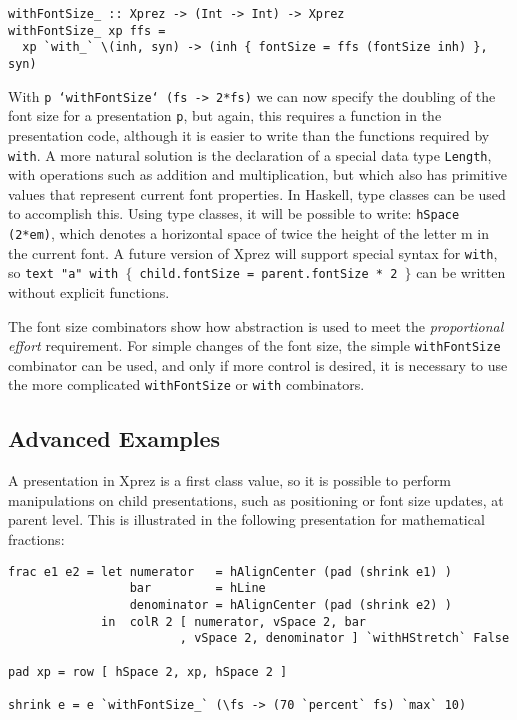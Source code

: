 \begin{small}
\begin{verbatim}
withFontSize_ :: Xprez -> (Int -> Int) -> Xprez
withFontSize_ xp ffs = 
  xp `with_` \(inh, syn) -> (inh { fontSize = ffs (fontSize inh) }, syn)
\end{verbatim}
\end{small}

With \texttt{p `withFontSize` (fs -> 2*fs)} we can now specify the doubling of the font size for a presentation \texttt{p}, but again, this requires a function in the presentation code, although it is easier to write than the functions required by \texttt{with}. A more natural solution is the declaration of a special data type \texttt{Length}, with operations such as addition and multiplication, but which also has primitive values that represent current font properties. In Haskell, type classes can be used to accomplish this. Using type classes, it will be possible to write: \linebreak \texttt{hSpace (2*em)}, which denotes a horizontal space of twice the height of the letter m in the current font. A future version of {\sc Xprez} will support special syntax for \texttt{with}, so \texttt{text "a" with $\{$ child.fontSize = parent.fontSize * 2 $\}$} can be written without explicit functions.

The font size combinators show how abstraction is used to meet the {\em proportional effort} requirement. For simple changes of the font size, the simple \texttt{withFontSize} combinator can be used, and only if more control is desired, it is necessary to use the more complicated \texttt{withFontSize} or \texttt{with} combinators.


%									
\subsection{Advanced Examples}

A presentation in {\sc Xprez} is a first class value, so it is possible to perform manipulations on child presentations, such as positioning or font size updates, at parent level. This is illustrated in the following presentation for mathematical fractions: 

\begin{small}
\begin{verbatim}
frac e1 e2 = let numerator   = hAlignCenter (pad (shrink e1) )
                 bar         = hLine
                 denominator = hAlignCenter (pad (shrink e2) )
             in  colR 2 [ numerator, vSpace 2, bar
                        , vSpace 2, denominator ] `withHStretch` False

pad xp = row [ hSpace 2, xp, hSpace 2 ]

shrink e = e `withFontSize_` (\fs -> (70 `percent` fs) `max` 10)
\end{verbatim}
\end{small}

